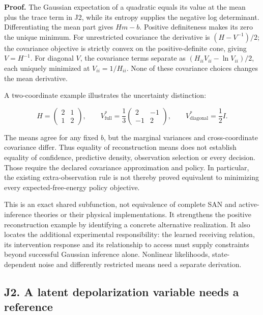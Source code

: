 \documentclass[
  american,
  11pt,
  letterpaper,
]{article}
\begin{document}
\textbf{Proof.} The Gaussian expectation of a quadratic equals its value at the mean plus the trace term in J2, while its entropy supplies the negative log determinant. Differentiating the mean part gives \(Hm-b\). Positive definiteness makes its zero the unique minimum. For unrestricted covariance the derivative is \((H-V^{-1})/2\); the covariance objective is strictly convex on the positive-definite cone, giving \(V=H^{-1}\). For diagonal \(V\), the covariance terms separate as \((H_{ii}V_{ii}-\ln V_{ii})/2\), each uniquely minimized at \(V_{ii}=1/H_{ii}\). None of these covariance choices changes the mean derivative.

A two-coordinate example illustrates the uncertainty distinction:

\begin{equation}
H=\begin{pmatrix}2&1\\1&2\end{pmatrix},\qquad
V^*_{\mathrm{full}}=\frac13\begin{pmatrix}2&-1\\-1&2\end{pmatrix},\qquad
V^*_{\mathrm{diagonal}}=\frac12 I.
\tag{J4}
\end{equation}

The means agree for any fixed \(b\), but the marginal variances and cross-coordinate covariance differ. Thus equality of reconstruction means does not establish equality of confidence, predictive density, observation selection or every decision. Those require the declared covariance approximation and policy. In particular, the existing extra-observation rule is not thereby proved equivalent to minimizing every expected-free-energy policy objective.

This is an exact shared subfunction, not equivalence of complete SAN and active-inference theories or their physical implementations. It strengthens the positive reconstruction example by identifying a concrete alternative realization. It also locates the additional experimental responsibility: the learned receiving relation, its intervention response and its relationship to access must supply constraints beyond successful Gaussian inference alone. Nonlinear likelihoods, state-dependent noise and differently restricted means need a separate derivation.

\subsection{J2. A latent depolarization variable needs a reference}\label{j2.-a-latent-depolarization-variable-needs-a-reference}
\end{document}
